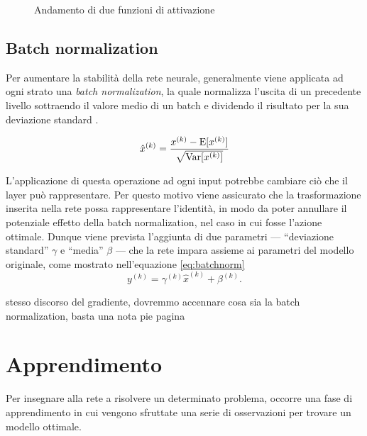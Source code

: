 \begin{figure}[htb]
	\centering
	\quad
	
	\caption{Andamento di due funzioni di attivazione}
	\label{fig:subfig}
\end{figure}


\subsection{Batch normalization}
\label{subsec:normalization}

Per aumentare la stabilità della rete neurale, generalmente viene applicata ad ogni strato una \emph{batch normalization}, la quale normalizza l'uscita di un precedente livello sottraendo il valore medio di un batch e dividendo il risultato per la sua deviazione standard \cite{ioffe2015batch}.

\begin{equation}
	\hat{x}^{(k)}=\frac{x^{(k)}-\operatorname{E}[x^{(k)}]}{\sqrt{\operatorname{Var}[x^{(k)}]}}
\end{equation}

L'applicazione di questa operazione ad ogni input potrebbe cambiare ciò che il layer può rappresentare. Per questo motivo viene assicurato che la trasformazione inserita nella rete possa rappresentare l'identità, in modo da poter annullare il potenziale effetto della batch normalization, nel caso in cui fosse l'azione ottimale.
Dunque viene prevista l'aggiunta di due parametri --- ``deviazione standard'' $\gamma$ e ``media'' $\beta$ --- che la rete impara assieme ai parametri del modello originale, come mostrato nell'equazione \ref{eq:batchnorm}
\begin{equation}
	y^{(k)}=\gamma^{(k)}\hat{x}^{(k)}+\beta^{(k)}\mbox{.}
	\label{eq:batchnorm}
\end{equation}

{\color{red} stesso discorso del gradiente, dovremmo accennare cosa sia la batch normalization, basta una nota pie pagina}

\section{Apprendimento}
\label{sec:apprendimento}
Per insegnare alla rete a risolvere un determinato problema, occorre una fase di apprendimento in cui vengono sfruttate una serie di osservazioni per trovare un modello ottimale.


